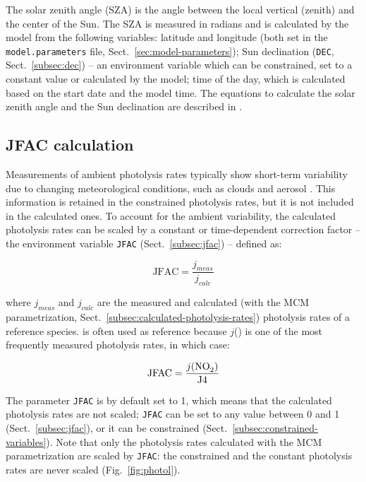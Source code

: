 The solar zenith angle (SZA) is the angle between the local vertical (zenith) and the center of
the Sun. The SZA is measured in radians and is calculated by the model from the following
variables: latitude and longitude (both set in the \texttt{model.parameters} file,
Sect.~\ref{sec:model-parameters}); Sun declination (\texttt{DEC}, Sect.~\ref{subsec:dec}) -- an
environment variable which can be constrained, set to a constant value or calculated by the
model; time of the day, which is calculated based on the start date and the model time. The
equations to calculate the solar zenith angle and the Sun declination are described in
\citet{madronich_1993}.

\subsection{JFAC calculation} \label{subsec:jfac-calculation}

Measurements of ambient photolysis rates typically show short-term variability due to changing
meteorological conditions, such as clouds and aerosol \citep{sommariva_2020}. This information
is retained in the constrained photolysis rates, but it is not included in the calculated
ones. To account for the ambient variability, the calculated photolysis rates can be scaled by
a constant or time-dependent correction factor -- the environment variable \texttt{JFAC}
(Sect.~\ref{subsec:jfac}) -- defined as:

\begin{equation}
  \mathrm{JFAC} = \frac{j_{meas}}{j_{calc}}
\end{equation}

where $j_{meas}$ and $j_{calc}$ are the measured and calculated (with the MCM parametrization,
Sect.~\ref{subsec:calculated-photolysis-rates}) photolysis rates of a reference
species.  is often used as reference because $j$() is one of the most
frequently measured photolysis rates, in which case:

\begin{equation}
  \mathrm{JFAC} = \frac{j(\cf{NO2})}{\mathrm{J}4}
\end{equation}

The parameter \texttt{JFAC} is by default set to 1, which means that the calculated photolysis
rates are not scaled; \texttt{JFAC} can be set to any value between 0 and 1
(Sect.~\ref{subsec:jfac}), or it can be constrained (Sect.~\ref{subsec:constrained-variables}).
Note that only the photolysis rates calculated with the MCM parametrization are scaled by
\texttt{JFAC}: the constrained and the constant photolysis rates are never scaled
(Fig.~\ref{fig:photol}).

